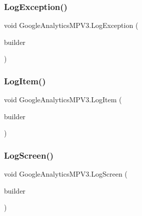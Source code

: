 \mbox{\label{class_google_analytics_m_p_v3_a63f189d886bd0ebfcbe9102b16f9d634}} 
\subsubsection{\texorpdfstring{Log\+Exception()}{LogException()}}
{\footnotesize\ttfamily void Google\+Analytics\+M\+P\+V3.\+Log\+Exception (\begin{DoxyParamCaption}\item[{\hyperlink{class_exception_hit_builder}{Exception\+Hit\+Builder}}]{builder }\end{DoxyParamCaption})}

\mbox{\label{class_google_analytics_m_p_v3_ae67722dc321d680821c3f15284eb8942}} 
\subsubsection{\texorpdfstring{Log\+Item()}{LogItem()}}
{\footnotesize\ttfamily void Google\+Analytics\+M\+P\+V3.\+Log\+Item (\begin{DoxyParamCaption}\item[{\hyperlink{class_item_hit_builder}{Item\+Hit\+Builder}}]{builder }\end{DoxyParamCaption})}

\mbox{\label{class_google_analytics_m_p_v3_a8465e63fa02c2c1413d3a1e24f9b0548}} 
\subsubsection{\texorpdfstring{Log\+Screen()}{LogScreen()}}
{\footnotesize\ttfamily void Google\+Analytics\+M\+P\+V3.\+Log\+Screen (\begin{DoxyParamCaption}\item[{\hyperlink{class_app_view_hit_builder}{App\+View\+Hit\+Builder}}]{builder }\end{DoxyParamCaption})}

